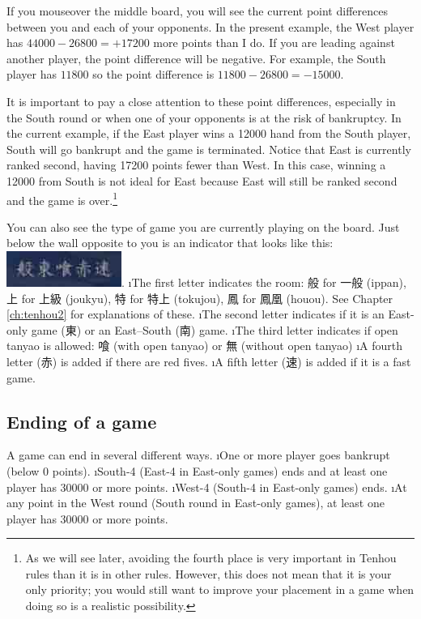 \bigskip
If you mouseover the middle board, you will see the current point differences between you and each of your opponents.
In the present example, the West player has $44000 - 26800 = + 17200$ more points than I do. If you are leading against another player, the point difference will be negative. For example, the South player has $11800$ so the point difference is $11800 - 26800 = -15000$.

\bigskip
It is important to pay a close attention to these point differences, especially in the South round or when one of your opponents is at the risk of bankruptcy. In the current example, if the East player wins a 12000 hand from the South player, South will go bankrupt and the game is terminated. Notice that East is currently ranked second, having 17200 points fewer than West. In this case, winning a 12000 from South is not ideal for East because East will still be ranked second and the game is over.\footnote{As we will see later, avoiding the fourth place is very important in {\jap Tenhou} rules than it is in other rules. However, this does not mean that it is your only priority; you would still want to improve your placement in a game when doing so is a realistic possibility.}

\bigskip

You can also see the type of game you are currently playing on the board. Just below the wall opposite to you is an indicator that looks like this: \includegraphics[width=.2\textwidth,clip]{figs/gametype.jpg}.
\bi
\i The first letter indicates the room: 般 for 一般 ({\jap ippan}), 上 for 上級 ({\jap joukyu}), 特 for 特上 ({\jap tokujou}), 鳳 for 鳳凰 ({\jap houou}). See Chapter \ref{ch:tenhou2} for explanations of these.
\i The second letter indicates if it is an East-only game (東) or an East--South (南) game.
\i The third letter indicates if open {\jap tanyao} is allowed: 喰 (with open {\jap tanyao}) or 無 (without open {\jap tanyao})
\i A fourth letter (赤) is added if there are red fives.
\i A fifth letter (速) is added if it is a fast game.
\ei

\vfill

\subsection{Ending of a game}
A game can end in several different ways.
\bi
\i One or more player goes bankrupt (below 0 points).
\i South-4 (East-4 in East-only games) ends and at least one player has 30000 or more points.
\i West-4 (South-4 in East-only games) ends.
\i At any point in the West round (South round in East-only games), at least one player has 30000 or more points.
\ei

